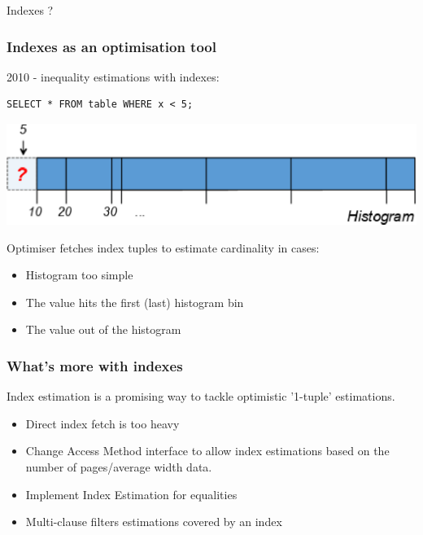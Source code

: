 \documentclass{beamer}
\begin{document}

\begin{frame}
\vspace*{\fill}
\begin{center}
Indexes ?
\end{center}
\vspace*{\fill}
\end{frame}

\begin{frame}[fragile]\frametitle{Indexes as an optimisation tool}
2010 - inequality estimations with indexes:
\begin{lstlisting}
SELECT * FROM table WHERE x < 5;
\end{lstlisting}
\begin{center}
  \includegraphics[scale=0.5]{pics/histogram}
\end{center}
Optimiser fetches index tuples to estimate cardinality in cases:
\begin{itemize}
  \item Histogram too simple
  \item The value hits the first (last) histogram bin
  \item The value out of the histogram
\end{itemize}
\end{frame}

\begin{frame}[fragile]\frametitle{What's more with indexes}
Index estimation is a promising way to tackle optimistic '1-tuple' estimations.
\begin{itemize}
  \item Direct index fetch is too heavy
  \item Change Access Method interface to allow index estimations based on the number of pages/average width data.
  \item Implement Index Estimation for equalities
  \item Multi-clause filters estimations covered by an index
\end{itemize}
\end{frame}
\end{document}
